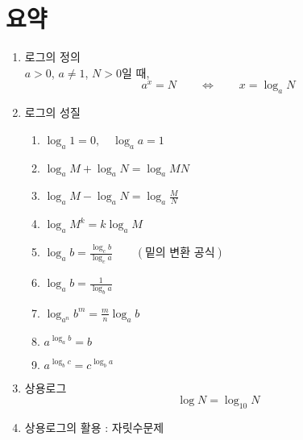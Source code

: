 \documentclass{oblivoir}
\begin{document}
\section*{요약}
\begin{enumerate}[label=\arabic*.,itemsep=40pt]
\item
로그의 정의\\
\(a>0\), \(a\neq1\), \(N>0\)일 때,
\[a^x=N\qquad\iff\qquad x=\log_aN\]
\item
로그의 성질
\begin{enumerate}[itemsep=10pt]
\item
\(\log_a1=0,\quad\log_aa=1\)
\item
\(\log_aM+\log_aN=\log_aMN\)
\item
\(\displaystyle\log_aM-\log_aN=\log_a{\frac MN}\)
\item
\(\log_a{M^k}=k\log_aM\)
\item
\(\displaystyle\log_ab=\frac{\log_cb}{\log_ca}\qquad(\text{밑의 변환 공식})\)
\item
\(\displaystyle\log_ab=\frac1{\log_ba}\)
\item
\(\displaystyle\log_{a^n}{b^m}=\frac mn \log_ab\)
\item
\(\displaystyle a^{\log_ab}=b\)
\item
\(\displaystyle a^{\log_bc}=c^{\log_ba}\)
\end{enumerate}
\item
상용로그
\[\log N=\log_{10}N\]
\item
상용로그의 활용 : 자릿수문제
\end{enumerate}
\end{document}
